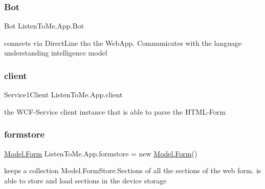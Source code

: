 \subsubsection{\texorpdfstring{Bot}{Bot}}
{\footnotesize\ttfamily Bot Listen\+To\+Me.\+App.\+Bot\hspace{0.3cm}{\ttfamily [static]}}



connects via Direct\+Line tho the Web\+App. Communicates with the language understanding intelligence model 

\mbox{\label{class_listen_to_me_1_1_app_a41b762ac78fada5d35954d39419b8e36}} 
\subsubsection{\texorpdfstring{client}{client}}
{\footnotesize\ttfamily Service1\+Client Listen\+To\+Me.\+App.\+client\hspace{0.3cm}{\ttfamily [static]}}



the W\+C\+F-\/\+Service client instance that is able to parse the H\+T\+M\+L-\/\+Form 

\mbox{\label{class_listen_to_me_1_1_app_a3e094e220103fe4590cf50c22f38ee65}} 
\subsubsection{\texorpdfstring{formstore}{formstore}}
{\footnotesize\ttfamily \mbox{\hyperlink{class_listen_to_me_1_1_model_1_1_form}{Model.\+Form}} Listen\+To\+Me.\+App.\+formstore = new \mbox{\hyperlink{class_listen_to_me_1_1_model_1_1_form}{Model.\+Form}}()\hspace{0.3cm}{\ttfamily [static]}}



keeps a collection Model.\+Form\+Store.\+Sections of all the sections of the web form. is able to store and load sections in the device storage 

\mbox{\label{class_listen_to_me_1_1_app_a311ccaa1ae0fd9cf9f89d3e3466098fe}} 
